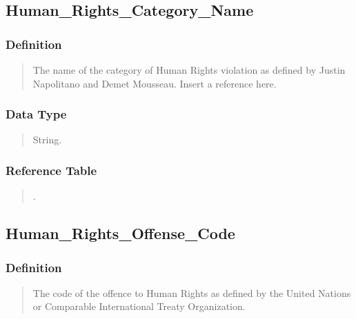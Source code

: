 \documentclass[letterpaper,10pt,english]{sphinxmanual}
\begin{document}
\subsection{Human\_Rights\_Category\_Name}
\label{\detokenize{database_schema:human-rights-category-name}}

\subsubsection{Definition}
\label{\detokenize{database_schema:id70}}\begin{quote}

\sphinxAtStartPar
The name of the category of Human Rights violation as defined by Justin Napolitano and Demet Mousseau. Insert a reference here.
\end{quote}


\subsubsection{Data Type}
\label{\detokenize{database_schema:id71}}\begin{quote}

\sphinxAtStartPar
String.
\end{quote}


\subsubsection{Reference Table}
\label{\detokenize{database_schema:id72}}\begin{quote}

\sphinxAtStartPar
{\hyperref[\detokenize{database_schema:human-rights-category-table}]{}}.
\end{quote}


\subsection{Human\_Rights\_Offense\_Code}
\label{\detokenize{database_schema:human-rights-offense-code}}

\subsubsection{Definition}
\label{\detokenize{database_schema:id73}}\begin{quote}

\sphinxAtStartPar
The code of the offence to Human Rights as defined by the United Nations or Comparable International Treaty Organization.
\end{quote}
\end{document}

